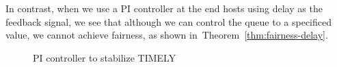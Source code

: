 In contrast, when we use a PI controller at the end hosts using delay
as the feedback signal, we see that although we can control the queue
to a specificed value, we cannot achieve fairness, as shown
in~Theorem~\ref{thm:fairness-delay}.
\begin{figure}
\center
\caption{PI controller to stabilize TIMELY}
\label{fig:dcqcn_pi}
\end{figure}

